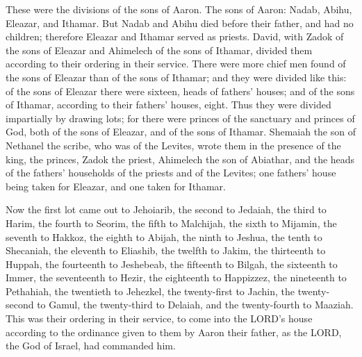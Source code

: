  These were the divisions of the sons of Aaron. The sons
of Aaron: Nadab, Abihu, Eleazar, and Ithamar.  But Nadab
and Abihu died before their father, and had no children; therefore
Eleazar and Ithamar served as priests.  David, with Zadok
of the sons of Eleazar and Ahimelech of the sons of Ithamar, divided
them according to their ordering in their service.  There
were more chief men found of the sons of Eleazar than of the sons of
Ithamar; and they were divided like this: of the sons of Eleazar there
were sixteen, heads of fathers' houses; and of the sons of Ithamar,
according to their fathers' houses, eight.  Thus they were
divided impartially by drawing lots; for there were princes of the
sanctuary and princes of God, both of the sons of Eleazar, and of the
sons of Ithamar.  Shemaiah the son of Nethanel the scribe,
who was of the Levites, wrote them in the presence of the king, the
princes, Zadok the priest, Ahimelech the son of Abiathar, and the heads
of the fathers' households of the priests and of the Levites; one
fathers' house being taken for Eleazar, and one taken for Ithamar.

 Now the first lot came out to Jehoiarib, the second to
Jedaiah,  the third to Harim, the fourth to Seorim,
 the fifth to Malchijah, the sixth to Mijamin,
 the seventh to Hakkoz, the eighth to Abijah,
 the ninth to Jeshua, the tenth to Shecaniah,
 the eleventh to Eliashib, the twelfth to Jakim,
 the thirteenth to Huppah, the fourteenth to Jeshebeab,
 the fifteenth to Bilgah, the sixteenth to Immer,
 the seventeenth to Hezir, the eighteenth to Happizzez,
 the nineteenth to Pethahiah, the twentieth to Jehezkel,
 the twenty-first to Jachin, the twenty-second to Gamul,
 the twenty-third to Delaiah, and the twenty-fourth to
Maaziah.  This was their ordering in their service, to
come into the LORD's house according to the ordinance given to them by
Aaron their father, as the LORD, the God of Israel, had commanded him.

